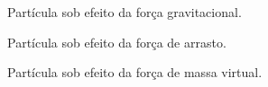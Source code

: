 \documentclass{beamer}
\begin{document}
\begin{frame}
\begin{minipage}{.48\textwidth}
\begin{figure}
{      } {\raggedleft \tiny Partícula sob efeito da força gravitacional.}
    \end{figure}
  \end{minipage}
  
  \begin{minipage}{.48\textwidth}
    \begin{figure}
       {\raggedleft \tiny Partícula sob efeito da força de arrasto.}
    \end{figure}
  \end{minipage}
  \hfill
  \begin{minipage}{.48\textwidth}
    \begin{figure}
       {\raggedleft \tiny Partícula sob efeito da força de massa virtual.}
    \end{figure}
  \end{minipage}
\end{frame}
\end{document}
